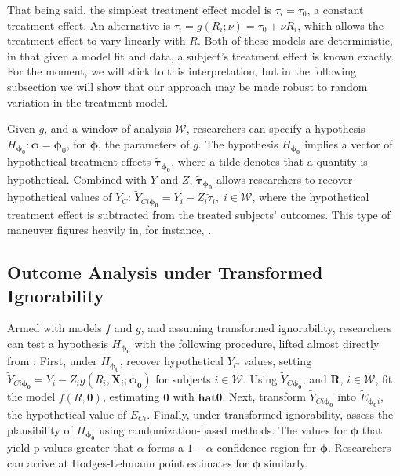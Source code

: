 \documentclass[12pt]{article}
\newcommand{\g}{g}
\newcommand{\ych}{E}
\newcommand{\hyp}{H_{\bm{\phi_0}}}
\begin{document}
That being said, the simplest treatment effect model is $\tau_i=\tau_0$, a constant treatment effect.
An alternative is $\tau_i=\g(R_i;\nu)=\tau_0+\nu R_i$, which allows the treatment effect to vary linearly with $R$.
Both of these models are deterministic, in that given a model fit and data, a subject's treatment effect is known exactly.
For the moment, we will stick to this interpretation, but in the
following subsection we will show that our approach may be made robust
to random variation in the treatment model.

Given $\g$, and a window of analysis $\mathcal{W}$, researchers can
specify a hypothesis $\hyp: \bm{\phi}=\bm{\phi}_0 $, for
$\bm{\phi}$, the parameters of $\g$.
The hypothesis $\hyp$ implies a vector of hypothetical treatment
effects $\bm{\tilde{\tau}_{\phi_0}}$, where a tilde denotes that a quantity is hypothetical.
Combined with $Y$ and $Z$, $\bm{\tilde{\tau}_{\phi_0}}$
allows researchers to recover hypothetical values of $Y_C$:
$\tilde{Y}_{Ci\bm{\phi_0}}=Y_i-Z_i\tilde{\tau}_i, \; i\in\mathcal{W}$, where the
hypothetical treatment effect is subtracted from the treated subjects'
outcomes.
This type of maneuver figures heavily in, for instance, \citet{rosenbaum2002covariance}.

\subsection{Outcome Analysis under Transformed Ignorability}
Armed with models $f$ and $\g$, and assuming transformed ignorability, researchers can test a hypothesis $\hyp$ with the following procedure, lifted almost directly from \citet{rosenbaum2002covariance}:
First, under $\hyp$, recover hypothetical $Y_C$ values, setting $\tilde{Y}_{Ci\bm{\phi_0}}=Y_i-Z_i \g(R_i,\bm{X}_i;\bm{\phi_0})$ for subjects $i\in\mathcal{W}$.
Using $\tilde{Y}_{C\bm{\phi_0}}$, and $\bm{R}$, $i\in\mathcal{W}$, fit the model $f(R,\bm{\theta})$, estimating $\bm{\theta}$ with $\bm{hat{\theta}}$.
Next, transform $\tilde{Y}_{Ci\bm{\phi_0}}$ into $\tilde{\ych}_{\bm{\phi_0}i}$, the hypothetical value of $\ych_{Ci}$.
Finally, under transformed ignorability, assess the plausibility of $\hyp$ using randomization-based methods.
The values for $\bm{\phi}$ that yield p-values greater that
$\alpha$ forms a $1-\alpha$ confidence region for $\bm{\phi}$.
Researchers can arrive at Hodges-Lehmann point estimates
\citep{hodges1963estimates} for $\bm{\phi}$ similarly.
\end{document}

